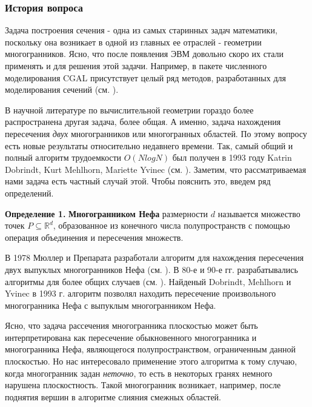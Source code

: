 \documentclass[a4paper,12pt, titlepage]{article}
\begin{document}
\subsubsection{История вопроса}
\begin{flushleft}
	Задача построения сечения - одна из самых старинных задач математики, поскольку она возникает в одной из главных
ее отраслей - геометрии многогранников. Ясно, что после появления ЭВМ довольно скоро их стали применять и для решения этой задачи.
Например, в пакете численного моделирования CGAL присутствует целый ряд методов, разработанных для моделирования сечений (см. 
\cite{CGAL}).
\end{flushleft}
\begin{flushleft}
	В научной литературе по вычислительной геометрии гораздо более распространена другая задача, более общая. А именно,
задача нахождения пересечения \textit{двух} многогранников или многогранных областей. По этому вопросу есть новые результаты
относительно недавнего времени. Так, самый общий и полный алгоритм трудоемкости $O(NlogN)$ был получен в 1993 году 
Katrin Dobrindt, Kurt Mehlhorn, Mariette Yvinec (см. \cite{DMY93}). Заметим, что рассматриваемая нами задача есть частный
случай этой. Чтобы пояснить это, введем ряд определений.
\end{flushleft}
\begin{flushleft}
	\textbf{Определение 1.} \textbf{Многогранником Нефа} размерности $d$ называется множество точек 
$P \subseteq \mathbb{R}^{d}$, образованное из конечного числа полупространств с помощью операция объединения и пересечения
множеств.
\end{flushleft}
\begin{flushleft}
	В 1978 Мюллер и Препарата разработали алгоритм для нахождения пересечения двух выпуклых многогранников Нефа (см. \cite{MP78}).
В 80-е и 90-е гг. разрабатывались алгоритмы для более общих случаев (см. \cite{NP82, DK83, MS85, Cha92, DMY93}). Найденый 
Dobrindt, Mehlhorn и Yvinec в 1993 г. алгоритм позволял находить пересечение произвольного многогранника Нефа с выпуклым многогранником 
Нефа.
\end{flushleft}
\begin{flushleft}
	Ясно, что задача рассечения многогранника плоскостью может быть интерпретирована как пересечение обыкновенного многогранника 
и многогранника Нефа, являющегося полупространством, ограниченным данной плоскостью. Но нас интересовало применение этого алгоритма к 
тому случаю, когда многогранник задан \textit{неточно}, то есть в некоторых гранях немного нарушена плоскостность. Такой многогранник
возникает, например, после поднятия вершин в алгоритме слияния смежных областей.
\end{flushleft}
\end{document}
